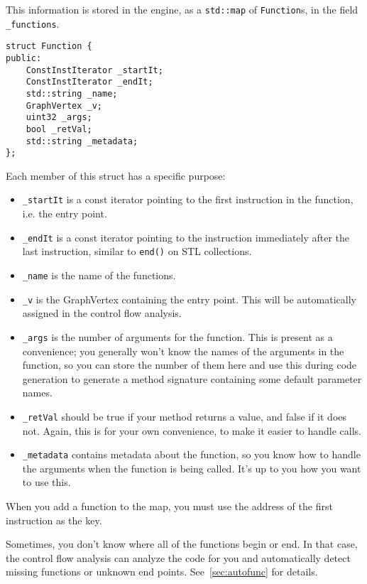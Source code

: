 This information is stored in the engine, as a \verb+std::map+ of \verb+Function+s, in the field \verb+ _functions+.

\begin{C++}
\begin{lstlisting}
struct Function {
public:
	ConstInstIterator _startIt;
	ConstInstIterator _endIt;
	std::string _name;
	GraphVertex _v;
	uint32 _args;
	bool _retVal;
	std::string _metadata;
};
\end{lstlisting}
\end{C++}

Each member of this struct has a specific purpose:
\begin{itemize}
\item \verb+_startIt+ is a const iterator pointing to the first instruction in the function, i.e. the entry point.
\item \verb+_endIt+ is a const iterator pointing to the instruction immediately after the last instruction, similar to \verb+end()+ on STL collections.
\item \verb+_name+ is the name of the functions.
\item \verb+_v+ is the GraphVertex containing the entry point. This will be automatically assigned in the control flow analysis.
\item \verb+_args+ is the number of arguments for the function. This is present as a convenience; you generally won't know the names of the arguments in the function, so you can store the number of them here and use this during code generation to generate a method signature containing some default parameter names.
\item \verb+_retVal+ should be true if your method returns a value, and false if it does not. Again, this is for your own convenience, to make it easier to handle calls.
\item \verb+_metadata+ contains metadata about the function, so you know how to handle the arguments when the function is being called. It's up to you how you want to use this.
\end{itemize}

When you add a function to the map, you must use the address of the first instruction as the key.

Sometimes, you don't know where all of the functions begin or end. In that case, the control flow analysis can analyze the code for you and automatically detect missing functions or unknown end points. See~\vref{sec:autofunc} for details.
